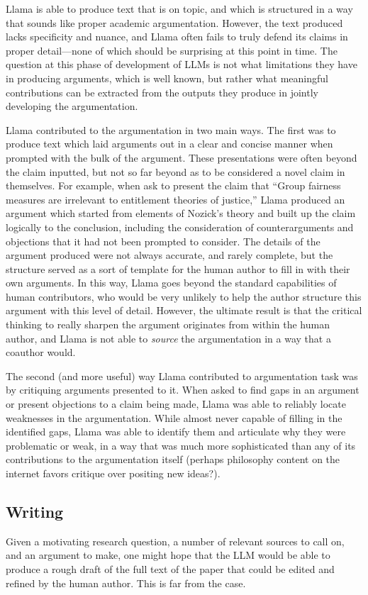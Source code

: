 Llama is able to produce text that is on topic, and which is structured in a way
that sounds like proper academic argumentation. However, the text produced lacks
specificity and nuance, and Llama often fails to truly defend its claims in 
proper detail—none of which should be surprising at this point in time. The
question at this phase of development of LLMs is not what limitations they have
in producing arguments, which is well known, but rather what meaningful 
contributions can be extracted from the outputs they produce in jointly
developing the argumentation.

Llama contributed to the argumentation in two main ways. The first was to
produce text which laid arguments out in a clear and concise manner when
prompted with the bulk of the argument. These presentations were often beyond
the claim inputted, but not so far beyond as to be considered a novel claim in
themselves. For example, when ask to present the claim that ``Group fairness measures
are irrelevant to entitlement theories of justice,'' Llama produced an argument
which started from elements of Nozick's theory and built up the claim logically
to the conclusion, including the consideration of counterarguments and 
objections that it had not been prompted to consider. The details of the argument
produced were not always accurate, and rarely complete, but the structure served
as a sort of template for the human author to fill in with their own arguments.
In this way, Llama goes beyond the standard capabilities of human contributors,
who would be very unlikely to help the author structure this argument with this
level of detail. However, the ultimate result is that the critical thinking to
really sharpen the argument originates from within the human author, and Llama 
is not able to \emph{source} the argumentation in a way that a coauthor would.

The second (and more useful) way Llama contributed to argumentation task was by
critiquing arguments presented to it. When asked to find gaps in an argument or
present objections to a claim being made, Llama was able to reliably locate 
weaknesses in the argumentation. While almost never capable of filling in the
identified gaps, Llama was able to identify them and articulate why they were
problematic or weak, in a way that was much more sophisticated than any of its
contributions to the argumentation itself (perhaps philosophy content on the 
internet favors critique over positing new ideas?).

\subsection{Writing}
Given a motivating research question, a number of relevant sources to call on,
and an argument to make, one might hope that the LLM would be able to produce
a rough draft of the full text of the paper that could be edited and refined by
the human author.  This is far from the case.

